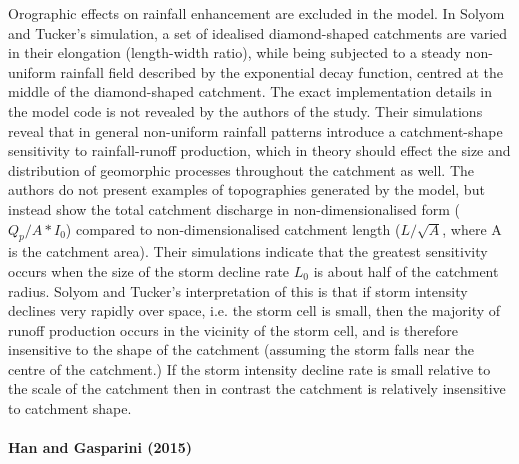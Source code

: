 \documentclass[12pt,oneside,PhD]{muthesis}
\begin{document}
Orographic effects on rainfall enhancement are excluded in the model. In Solyom and Tucker's simulation, a set of idealised diamond-shaped catchments are varied in their elongation (length-width ratio), while being subjected to a steady non-uniform rainfall field described by the exponential decay function, centred at the middle of the diamond-shaped catchment. The exact implementation details in the model code is not revealed by the authors of the study. Their simulations reveal that in general non-uniform rainfall patterns introduce a catchment-shape sensitivity to rainfall-runoff production, which in theory should effect the size and distribution of geomorphic processes throughout the catchment as well. The authors do not present examples of topographies generated by the model, but instead show the total catchment discharge in non-dimensionalised form (\(Q_p/A*I_0\)) compared to non-dimensionalised catchment length (\(L/\sqrt{A}\), where A is the catchment area). Their simulations indicate that the greatest sensitivity occurs when the size of the storm decline rate \(L_0\) is about half of the catchment radius. Solyom and Tucker's interpretation of this is that if storm intensity declines very rapidly over space, i.e. the storm cell is small, then the majority of runoff production occurs in the vicinity of the storm cell, and is therefore insensitive to the shape of the catchment (assuming the storm falls near the centre of the catchment.) If the storm intensity decline rate is small relative to the scale of the catchment then in contrast the catchment is relatively insensitive to catchment shape.

\paragraph{Han and Gasparini (2015)}
\end{document}
